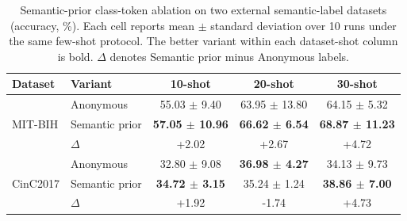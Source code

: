 \begin{table}[!htbp]
\centering
\caption{Semantic-prior class-token ablation on two external semantic-label datasets (accuracy, \%). Each cell reports mean $\pm$ standard deviation over 10 runs under the same few-shot protocol. The better variant within each dataset-shot column is bold. $\Delta$ denotes Semantic prior minus Anonymous labels.}
\label{tab:m2-semantic-prior-ablation-accuracy}
\scriptsize
\setlength{\tabcolsep}{3.4pt}
\renewcommand{\arraystretch}{1.06}
\begin{tabular}{@{}llccc@{}}
\toprule
Dataset & Variant & 10-shot & 20-shot & 30-shot \\
\midrule
\multirow{3}{*}{MIT-BIH}
& Anonymous & 55.03 $\pm$ 9.40 & 63.95 $\pm$ 13.80 & 64.15 $\pm$ 5.32 \\
& Semantic prior & \textbf{57.05 $\pm$ 10.96} & \textbf{66.62 $\pm$ 6.54} & \textbf{68.87 $\pm$ 11.23} \\
& $\Delta$ & +2.02 & +2.67 & +4.72 \\
\midrule
\multirow{3}{*}{CinC2017}
& Anonymous & 32.80 $\pm$ 9.08 & \textbf{36.98 $\pm$ 4.27} & 34.13 $\pm$ 9.73 \\
& Semantic prior & \textbf{34.72 $\pm$ 3.15} & 35.24 $\pm$ 1.24 & \textbf{38.86 $\pm$ 7.00} \\
& $\Delta$ & +1.92 & -1.74 & +4.73 \\
\bottomrule
\end{tabular}
\end{table}
